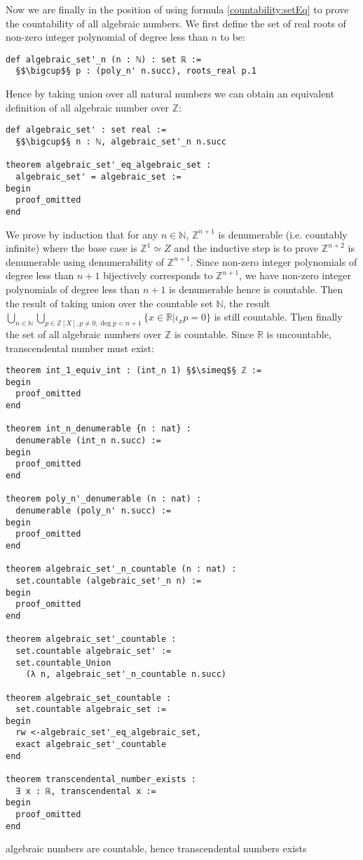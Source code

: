\documentclass{report}
\theoremstyle{definition}
\theoremstyle{plain}
\newenvironment{code}{\captionsetup{type=listing}}{}
\begin{document}
Now we are finally in the position of using formula \ref{countability:setEq} to prove the countability of all algebraic numbers. We first define the set of real roots of non-zero integer polynomial of degree less than $n$ to be:
\begin{verbatim}
def algebraic_set'_n (n : ℕ) : set ℝ := 
  §$\bigcup$§ p : (poly_n' n.succ), roots_real p.1
\end{verbatim}
Hence by taking union over all natural numbers we can obtain an equivalent definition of all algebraic number over $\mathbb{Z}$:
\begin{verbatim}
def algebraic_set' : set real := 
  §$\bigcup$§ n : ℕ, algebraic_set'_n n.succ

theorem algebraic_set'_eq_algebraic_set : 
  algebraic_set' = algebraic_set :=
begin
  proof_omitted
end
\end{verbatim}
We prove by induction that for any $n\in\mathbb N$, $\mathbb{Z}^{n+1}$ is denumerable (i.e. countably infinite) where the base case is $\mathbb Z^1\simeq Z$ and the inductive step is to prove $\mathbb{Z}^{n+2}$ is denumerable using denumerability of $\mathbb{Z}^{n+1}$. Since non-zero integer polynomials of degree less than $n+1$ bijectively corresponds to $\mathbb{Z}^{n+1}$, we have non-zero integer polynomials of degree less than $n+1$ is denumerable hence is countable. Then the result of taking union over the countable set $\mathbb N$, the result $ \bigcup_{n\in\mathbb N}\bigcup_{p\in\mathbb{Z}[X], p\ne 0, \deg{p}<n+1} \{x\in\mathbb{R}|\iota_xp=0\}$ is still countable. Then finally the set of all algebraic numbers over $\mathbb Z$ is countable. Since $\mathbb R$ is uncountable, transcendental number must exist:
\begin{code}
\begin{verbatim}
theorem int_1_equiv_int : (int_n 1) §$\simeq$§ ℤ := 
begin
  proof_omitted
end

theorem int_n_denumerable {n : nat} :
  denumerable (int_n n.succ) :=
begin
  proof_omitted
end

theorem poly_n'_denumerable (n : nat) : 
  denumerable (poly_n' n.succ) :=
begin
  proof_omitted
end

theorem algebraic_set'_n_countable (n : nat) :
  set.countable (algebraic_set'_n n) :=
begin
  proof_omitted
end

theorem algebraic_set'_countable : 
  set.countable algebraic_set' :=
  set.countable_Union 
    (λ n, algebraic_set'_n_countable n.succ)

theorem algebraic_set_countable : 
  set.countable algebraic_set :=
begin
  rw <-algebraic_set'_eq_algebraic_set, 
  exact algebraic_set'_countable
end

theorem transcendental_number_exists : 
  ∃ x : ℝ, transcendental x :=
begin
  proof_omitted
end
\end{verbatim}
\caption{algebraic numbers are countable, hence transcendental numbers exists}
\end{code}
\end{document}
